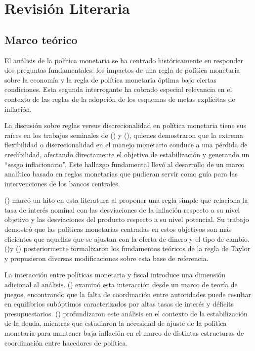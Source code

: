 \documentclass[
  man,
  longtable,
  nolmodern,
  notxfonts,
  notimes,
  colorlinks=true,linkcolor=blue,citecolor=blue,urlcolor=blue]{apa7}
\begin{document}
\newpage{}

\section{Revisión Literaria}\label{revisiuxf3n-literaria}

\subsection{Marco teórico}\label{marco-teuxf3rico}

El análisis de la política monetaria se ha centrado históricamente en
responder dos preguntas fundamentales: los impactos de una regla de
política monetaria sobre la economía y la regla de política monetaria
óptima bajo ciertas condiciones. Esta segunda interrogante ha cobrado
especial relevancia en el contexto de las reglas de la adopción de los
esquemas de metas explícitas de inflación.

La discusión sobre reglas versus discrecionalidad en política monetaria
tiene sus raíces en los trabajos seminales de
() y
(), quienes
demostraron que la extrema flexibilidad o discrecionalidad en el manejo
monetario conduce a una pérdida de credibilidad, afectando directamente
el objetivo de estabilización y generando un ``sesgo inflacionario''.
Este hallazgo fundamental llevó al desarrollo de un marco analítico
basado en reglas monetarias que pudieran servir como guía para las
intervenciones de los bancos centrales.

() marcó un hito en
esta literatura al proponer una regla simple que relaciona la tasa de
interés nominal con las desviaciones de la inflación respecto a su nivel
objetivo y las desviaciones del producto respecto a su nivel potencial.
Su trabajo demostró que las políticas monetarias centradas en estos
objetivos son más eficientes que aquellas que se ajustan con la oferta
de dinero y el tipo de cambio.
()y
()
posteriormente formalizaron los fundamentos teóricos de la regla de
Taylor y propusieron diversas modificaciones sobre esta base de
referencia.

La interacción entre políticas monetaria y fiscal introduce una
dimensión adicional al análisis.
() examinó esta
interacción desde un marco de teoría de juegos, encontrando que la falta
de coordinación entre autoridades puede resultar en equilibrios
subóptimos caracterizados por altas tasas de interés y déficits
presupuestarios. () profundizaron este análisis en el contexto de la estabilización
de la deuda, mientras que estudiaron la necesidad de ajuste de la
política monetaria para mantener baja inflación en el marco de distintas
estructuras de coordinación entre hacedores de política.
\end{document}
